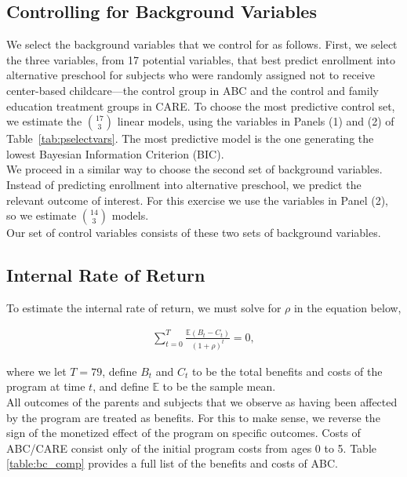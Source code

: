 \subsection{Controlling for Background Variables}

\noindent We select the background variables that we control for as follows. First, we select the three variables, from 17 potential variables, that best predict enrollment into alternative preschool for subjects who were randomly assigned not to receive center-based childcare---the control group in ABC and the control and family education treatment groups in CARE. To choose the most predictive control set, we estimate the $17 \choose 3$ linear models, using the variables in Panels (1) and (2) of Table~\ref{tab:pselectvars}. The most predictive model is the one generating the lowest Bayesian Information Criterion (BIC).\\

\noindent We proceed in a similar way to choose the second set of background variables. Instead of predicting enrollment into alternative preschool, we predict the relevant outcome of interest. For this exercise we use the variables in Panel (2), so we estimate $14 \choose 3$ models.\\

\noindent Our set of control variables consists of these two sets of background variables.

\singlespacing

\doublespacing

\subsection{Internal Rate of Return}
\label{app:method_irr}

\noindent To estimate the internal rate of return, we must solve for $\rho$ in the equation below,

\begin{align}
\sum_{t=0}^T \frac{ \mathbb{E} (B_t - C_t)}{(1+\rho)^t} = 0,
\end{align}

\noindent where we let $T = 79$, define $B_t$ and $C_t$ to be the total benefits and costs of the
program at time $t$, and define $\mathbb{E}$ to be the sample mean. \\

\noindent All outcomes of the parents and subjects that we observe as having been affected by the program
are treated as benefits. For this to make sense, we reverse the sign of the monetized effect of the program
on specific outcomes. Costs of ABC/CARE consist only of the initial program costs from ages 0 to 5.
Table \ref{table:bc_comp} provides a full list of the benefits and costs of ABC. \\

